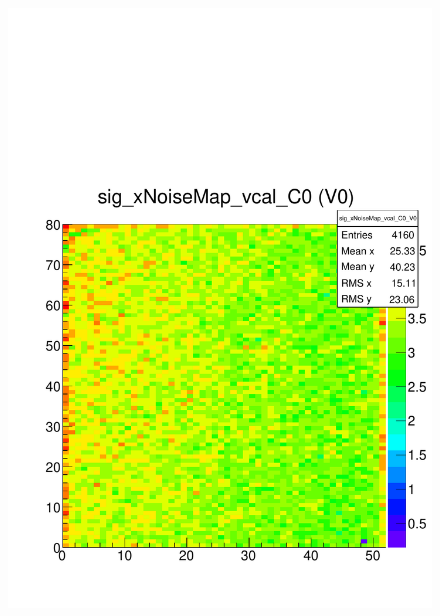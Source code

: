 \documentclass[a4paper,12pt,twoside]{article}
\begin{document}
\begin{figure} [h!]
\centering
\begin{minipage}{.48\textwidth}
  \centering
  \includegraphics[width=\textwidth]{./HRSCurves_sigMap.pdf}
  \label{HRSCurves-sigMap}
\end{minipage}%
\hspace{2mm}
\begin{minipage}{.48\textwidth}
  \centering

\end{minipage}
\end{figure}
\end{document}

